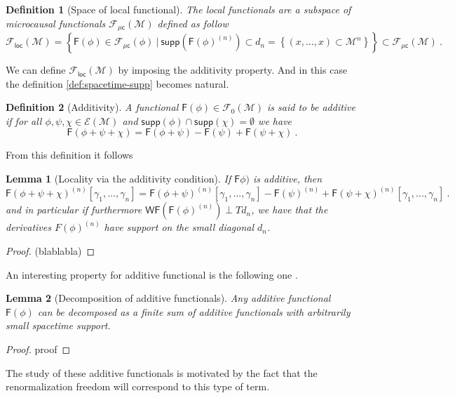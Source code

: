 \documentclass[11pt]{book}
\newcommand{\supp}{\mathsf{supp}}
\newcommand{\WF}{\mathsf{WF}}
\newcommand{\Ecal}{\mathcal{E}}
\newcommand{\Fcal}{\mathcal{F}}
\newcommand{\Mcal}{\mathcal{M}}
\newcommand{\Fsf}{\mathsf{F}}
\newcommand{\csf}{\mathsf{c}}
\theoremstyle{break}
\newtheorem{lemma}{Lemma}
\newtheorem{definition}{Definition}
\newtheorem{proof}{Proof}
\begin{document}
%
\begin{definition}[Space of local functional]
The local functionals are a subspace of microcausal functionals $\Fcal_{\mathsf{\mu c}}(\Mcal)$ defined as follow
%
\begin{equation*}
\Fcal_{\mathsf{loc}}(\Mcal) = \left\{ \Fsf(\phi) \in \Fcal_{\mu\csf}(\phi) \ \bigg| \ \supp\left(\Fsf(\phi)^{(n)}\right) \subset d_n = \left\{ (x,\dots,x) \subset \Mcal^n \right\} \right\} \subset \Fcal_{\mu\csf}(\Mcal) \ .
\end{equation*}
%
\end{definition}
%
We can define $\Fcal_{\mathsf{loc}}(\Mcal)$ by imposing the additivity property. And in this case the definition \ref{def:spacetime-supp} becomes natural.
%
\begin{definition}[Additivity]
A functional $\Fsf(\phi) \in \Fcal_0(\Mcal)$ is said to be additive if for all $\phi, \psi, \chi \in \Ecal(\Mcal)$ and $\supp(\phi) \cap \supp(\chi) = \emptyset$ we have 
%
\begin{equation*}
\Fsf(\phi + \psi + \chi) = \Fsf(\phi + \psi) - \Fsf(\psi) + \Fsf(\psi + \chi) \ . 
\end{equation*}
%
\end{definition}
%
%
From this definition it follows
%
\begin{lemma}[Locality via the additivity condition]
If $\Fsf\phi)$ is additive, then
\begin{equation*}
\Fsf(\phi + \psi + \chi)^{(n)}[\gamma_1,...,\gamma_n] = \Fsf(\phi + \psi)^{(n)}[\gamma_1,...,\gamma_n] - \Fsf(\psi)^{(n)} + \Fsf(\psi + \chi)^{(n)}[\gamma_1,...,\gamma_n] \ . 
\end{equation*}
and in particular if furthermore $\WF\left(\Fsf(\phi)^{(n)}\right) \perp Td_n$, we have that the derivatives $F(\phi)^{(n)}$ have support on the small diagonal $d_n$. 
\end{lemma}
%
\begin{proof}
(blablabla)
\end{proof}

%
An interesting property for additive functional is the following one \cite[Lemma 2.3.5]{Brunetti:2012ar}.
%
\begin{lemma}[Decomposition of additive functionals]
Any additive functional $\Fsf(\phi)$ can be decomposed as a finite sum of additive functionals with arbitrarily small spacetime support.
\end{lemma}
%
\begin{proof}
proof
\end{proof}
%
The study of these additive functionals is motivated by the fact that the renormalization freedom will correspond to this type of term.
\end{document}
